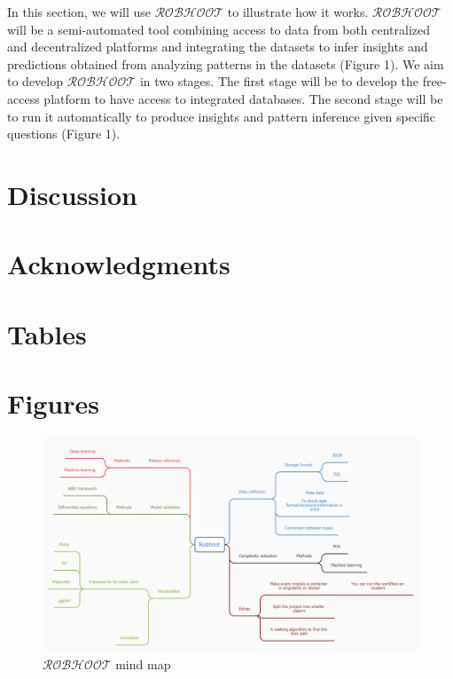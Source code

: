 \documentclass[english,12pt]{article}
\begin{document}
In this section, we will use $\mathcal{ROBHOOT}$ to illustrate how it
works. $\mathcal{ROBHOOT}$ will be a semi-automated tool combining
access to data from both centralized and decentralized platforms and
integrating the datasets to infer insights and predictions obtained
from analyzing patterns in the datasets (Figure 1). We aim to develop
$\mathcal{ROBHOOT}$ in two stages. The first stage will be to develop
the free-access platform to have access to integrated databases. The
second stage will be to run it automatically to produce insights and
pattern inference given specific questions (Figure 1). 

\section{Discussion}


\newpage
\section{Acknowledgments}


\newpage



\newpage

\section{Tables}


\newpage

\section{Figures}
\begin{figure}
\begin{center}
\vspace{-8 in}
\hspace{-0.5 in}\includegraphics[scale=0.3,angle=90]{mindmap.png}
\end{center}
\caption{$\mathcal{ROBHOOT}$ mind map}
\label{}
\end{figure}
\newpage
\end{document}
